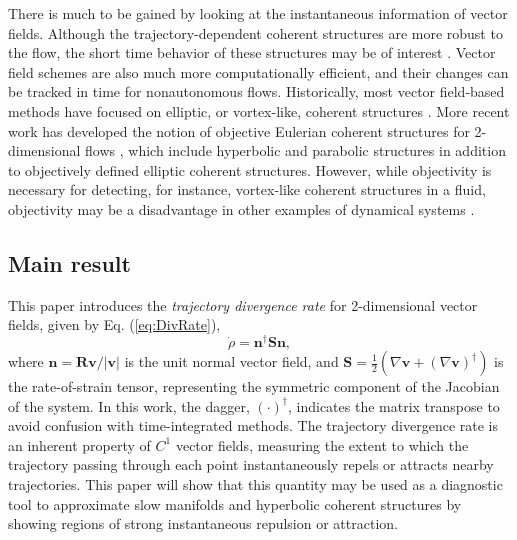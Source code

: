 \documentclass[twocolumn]{svjour3}
\begin{document}
There is much to be gained by looking at the instantaneous information of vector fields. Although the trajectory-dependent coherent structures are more robust to the flow, the short time behavior of these structures may be of interest \cite{haller2010localized}. Vector field schemes are also much more computationally efficient, and their changes can be tracked in time for nonautonomous flows. Historically, most vector field-based methods have focused on elliptic, or vortex-like, coherent structures \cite{chakraborty2005relationships}. More recent work has developed the notion of objective Eulerian coherent structures for 2-dimensional flows \cite{serra_objective_2016}, which include hyperbolic and parabolic structures in addition to objectively defined elliptic coherent structures. However, while objectivity is necessary for detecting, for instance, vortex-like coherent structures in a fluid, objectivity may be a disadvantage in other examples of dynamical systems \cite{haller_variational_2011,lopesino2017theoretical}.


\subsection{Main result}
This paper introduces the \textit{trajectory divergence rate} for 2-dimensional vector fields, given by Eq. (\ref{eq:DivRate}),
\begin{equation*}
\dot{\rho} = \mathbf{n}^\dagger\mathbf{S}\mathbf{n},
\end{equation*}
where $\mathbf{n} = \mathbf{R}\mathbf{v}/\left|\mathbf{v}\right|$ is the unit normal vector field, and $\mathbf{S}=\tfrac{1}{2}\left(\nabla\mathbf{v}+(\nabla\mathbf{v})^\dagger\right)$ is the rate-of-strain tensor, representing the symmetric component of the Jacobian of the system. In this work, the dagger, \((\cdot)^\dagger\), indicates the matrix transpose to avoid confusion with time-integrated methods. The trajectory divergence rate is an inherent property of $C^1$ vector fields, measuring the extent to which the trajectory passing through each point instantaneously repels or attracts nearby trajectories. This paper will show that this quantity may be used as a diagnostic tool to approximate slow manifolds and hyperbolic coherent structures by showing regions of strong instantaneous repulsion or attraction.

\end{document}
